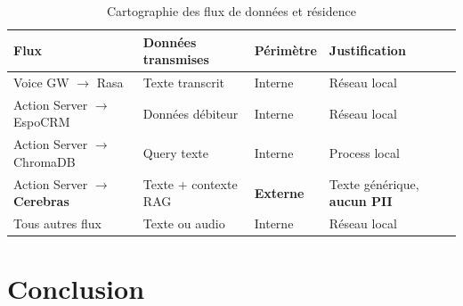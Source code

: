 \begin{table}[H]
  \centering
  \caption{Cartographie des flux de données et résidence}
  \label{tab:residence_donnees}
  \begin{tabularx}{\textwidth}{lXll}
    \toprule
    \textbf{Flux} & \textbf{Données transmises} & \textbf{Périmètre} & \textbf{Justification} \\
    \midrule
    Voice GW $\rightarrow$ Rasa    & Texte transcrit          & Interne  & Réseau local \\
    Action Server $\rightarrow$ EspoCRM & Données débiteur    & Interne  & Réseau local \\
    Action Server $\rightarrow$ ChromaDB & Query texte        & Interne  & Process local \\
    \rowcolor{yellow!20}
    Action Server $\rightarrow$ \textbf{Cerebras} & Texte + contexte \ac{RAG} & \textbf{Externe} & Texte générique, \textbf{aucun PII} \\
    Tous autres flux & Texte ou audio              & Interne  & Réseau local \\
    \bottomrule
  \end{tabularx}
\end{table}

\section{Conclusion}

